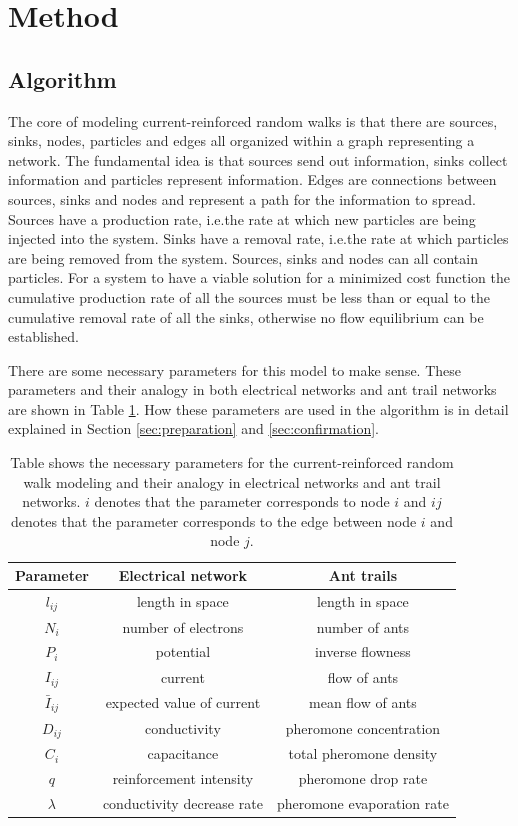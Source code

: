 \section{Method}
\label{sec:method}
\subsection{Algorithm}
The core of modeling current-reinforced random walks is that there are sources, sinks, nodes, particles and edges all organized within a graph representing a network. The fundamental idea is that sources send out information, sinks collect information and particles represent information. Edges are connections between sources, sinks and nodes and represent a path for the information to spread. Sources have a production rate, i.e.\@ the rate at which new particles are being injected into the system. Sinks have a removal rate, i.e.\@ the rate at which particles are being removed from the system. Sources, sinks and nodes can all contain particles. For a system to have a viable solution for a minimized cost function the cumulative production rate of all the sources must be less than or equal to the cumulative removal rate of all the sinks, otherwise no flow equilibrium can be established.

There are some necessary parameters for this model to make sense. These parameters and their analogy in both electrical networks and ant trail networks are shown in Table \ref{tab:parameters}. How these parameters are used in the algorithm is in detail explained in Section \ref{sec:preparation} and \ref{sec:confirmation}.

\begin{table}[H]
\renewcommand{\arraystretch}{1.2}
\centering
\caption{Table shows the necessary parameters for the current-reinforced random walk modeling and their analogy in electrical networks and ant trail networks. $i$ denotes that the parameter corresponds to node $i$ and $ij$ denotes that the parameter corresponds to the edge between node $i$ and node $j$.}
\label{tab:parameters}
\begin{tabular}{ c | c | c }                       
	\textbf{Parameter} & \textbf{Electrical network} & \textbf{Ant trails} \\
	\hline
	$l_{ij}$ & length in space & length in space \\
	\hline
	$N_{i}$ & number of electrons & number of ants \\
	\hline	
	$P_{i}$ & potential & inverse flowness \\
	\hline
	$I_{ij}$ & current & flow of ants \\
	\hline
	$\bar{I}_{ij}$ & expected value of current & mean flow of ants \\
	\hline
	$D_{ij}$ & conductivity & pheromone concentration \\
	\hline
	$C_{i}$ & capacitance & total pheromone density \\
	\hline
	$q$ & reinforcement intensity & pheromone drop rate \\
	\hline
	$\lambda$ & conductivity decrease rate & pheromone evaporation rate \\
\end{tabular} 
\end{table}

